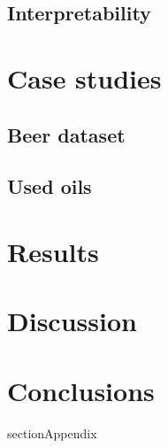 \documentclass{article}
\begin{document}
	\subsection{Interpretability}
		
	\section{Case studies}
	
	\subsection{Beer dataset}
	
	\subsection{Used oils}
	
	
	\section{Results}
	
	\section{Discussion}
	
	
	\section{Conclusions}

	\*section{Appendix}
	
\end{document}
